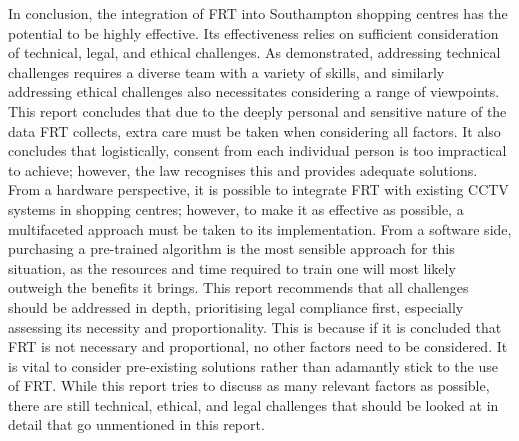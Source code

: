 \documentclass{article}
\begin{document}
In conclusion, the integration of FRT into Southampton shopping centres has the potential to be highly effective. Its effectiveness relies on sufficient consideration of technical, legal, and ethical challenges. As demonstrated, addressing technical challenges requires a diverse team with a variety of skills, and similarly addressing ethical challenges also necessitates considering a range of viewpoints. This report concludes that due to the deeply personal and sensitive nature of the data FRT collects, extra care must be taken when considering all factors. It also concludes that logistically, consent from each individual person is too impractical to achieve; however, the law recognises this and provides adequate solutions. From a hardware perspective, it is possible to integrate FRT with existing CCTV systems in shopping centres; however, to make it as effective as possible, a multifaceted approach must be taken to its implementation. From a software side, purchasing a pre-trained algorithm is the most sensible approach for this situation, as the resources and time required to train one will most likely outweigh the benefits it brings. This report recommends that all challenges should be addressed in depth, prioritising legal compliance first, especially assessing its necessity and proportionality. This is because if it is concluded that FRT is not necessary and proportional, no other factors need to be considered. It is vital to consider pre-existing solutions rather than adamantly stick to the use of FRT. While this report tries to discuss as many relevant factors as possible, there are still technical, ethical, and legal challenges that should be looked at in detail that go unmentioned in this report. 

\printbibliography
\end{document}
